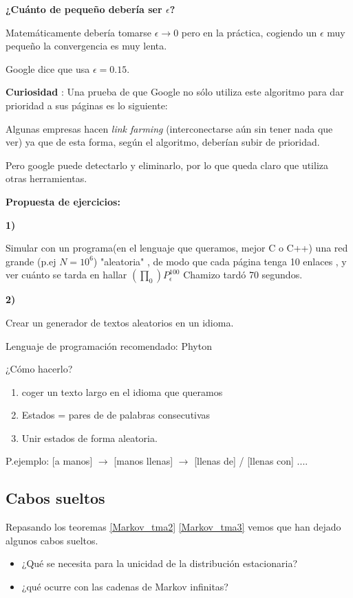 \textbf{¿Cuánto de pequeño debería ser $\epsilon$?}

Matemáticamente debería tomarse $\epsilon\rightarrow 0$ pero en la práctica, cogiendo un $\epsilon$ muy pequeño la convergencia es muy lenta.

Google dice que usa $\epsilon = 0.15$.

\textbf{Curiosidad} : Una prueba de que Google no sólo utiliza este algoritmo para dar prioridad a sus páginas es lo siguiente:

Algunas empresas hacen \textit{link farming} (interconectarse aún sin tener nada que ver) ya que de esta forma, según el algoritmo, deberían subir de prioridad.

\begin{center}


\end{center}

Pero google puede detectarlo y eliminarlo, por lo que queda claro que utiliza otras herramientas.

\textbf{Propuesta de ejercicios:}

\textbf{1)}


	Simular con un programa(en el lenguaje que queramos, mejor C o C++) una red grande (p.ej $N= 10^6$) "aleatoria" , de modo que cada página tenga 10 enlaces , y ver cuánto se tarda en hallar $(\prod_0) P_{\epsilon}^{100}$
	Chamizo tardó 70 segundos.



\textbf{2)}


	Crear un generador de textos aleatorios en un idioma.

	Lenguaje de programación recomendado: Phyton

	¿Cómo hacerlo?
	\begin{enumerate}
		\item coger un texto largo en el idioma que queramos
		\item Estados = pares de de palabras consecutivas
		\item Unir estados de forma aleatoria.
	\end{enumerate}
	P.ejemplo: [a manos] $\rightarrow$ [manos llenas] $\rightarrow$ [llenas de] / [llenas con] ....
	
\subsection{Cabos sueltos}
 Repasando los teoremas \ref{Markov_tma2} \ref{Markov_tma3} vemos que han dejado algunos cabos sueltos.
\begin{itemize}
	\item ¿Qué se necesita para la unicidad de la distribución estacionaria?
	\item ¿qué ocurre con las cadenas de Markov infinitas?
\end{itemize}

